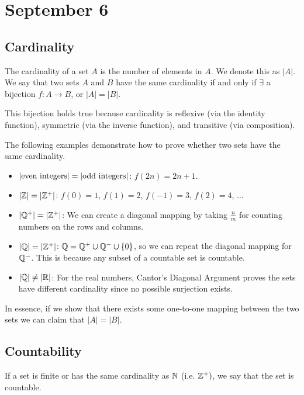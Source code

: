 \section{September 6}

\subsection{Cardinality}
\begin{definition}[Cardinality]
    The cardinality of a set $A$ is the number of elements in $A$. We denote this as $|A|$. We say that two sets $A$ and $B$ have the same cardinality if and only if $\exists$ a bijection $f: A \rightarrow B$, or $|A| = |B|$.
\end{definition}
\begin{remark}
    This bijection holds true because cardinality is reflexive (via the identity function), symmetric (via the inverse function), and transitive (via composition).
\end{remark}

\begin{remark}
    The following examples demonstrate how to prove whether two sets have the same cardinality.
\end{remark}
\begin{itemize}
    \item $|\textnormal{even integers}| = |\textnormal{odd integers}|$: $f(2n) = 2n + 1$.
    \item $|\mathbb{Z}| = |\mathbb{Z}^+|$: $f(0) = 1$, $f(1) = 2$, $f(-1) = 3$, $f(2) = 4$, $\ldots$
    \item $|\mathbb{Q}^+| = |\mathbb{Z}^+|$: We can create a diagonal mapping by taking $\frac{n}{m}$ for counting numbers on the rows and columns.
    \item $|\mathbb{Q}| = |\mathbb{Z}^+|$: $\mathbb{Q} = \mathbb{Q}^+ \cup \mathbb{Q}^- \cup \{0\}$, so we can repeat the diagonal mapping for $\mathbb{Q}^-$. This is because any subset of a countable set is countable.
    \item $|\mathbb{Q}| \neq |\mathbb{R}|$: For the real numbers, Cantor's Diagonal Argument proves the sets have different cardinality since no possible surjection exists.
\end{itemize}
In essence, if we show that there exists some one-to-one mapping between the two sets we can claim that $|A| = |B|$.

\subsection{Countability}
\begin{definition}[Countable]
    If a set is finite or has the same cardinality as $\mathbb{N}$ (i.e. $\mathbb{Z}^+)$, we say that the set is countable.
\end{definition}


